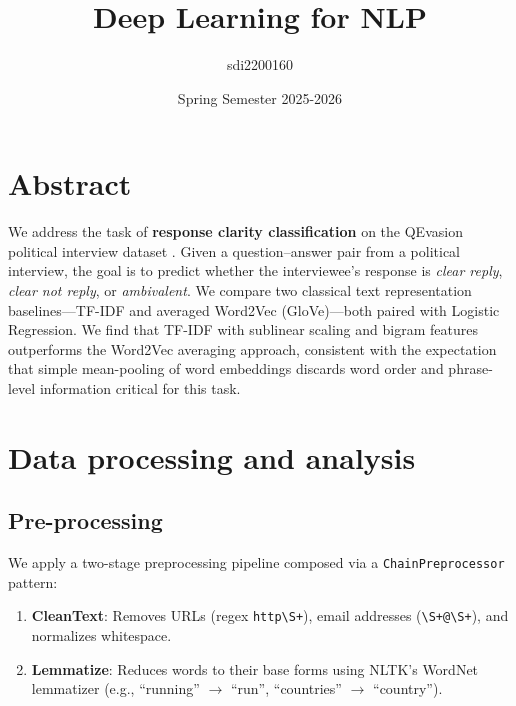 \documentclass[12pt]{fphw}
\title{Deep Learning for NLP} %
\author{sdi2200160} %
\date{Spring Semester 2025-2026} %
\institute{National and Kapodistrian University of Athens \\ Department of Informatics and Telecommunications} %
\begin{document}
\maketitle %

{
  \hypersetup{linkcolor=black}
  \tableofcontents
}
\newpage

\section{Abstract}

We address the task of \textbf{response clarity classification} on the QEvasion political interview dataset \cite{qevasion}. Given a question--answer pair from a political interview, the goal is to predict whether the interviewee's response is \emph{clear reply}, \emph{clear not reply}, or \emph{ambivalent}. We compare two classical text representation baselines---TF-IDF and averaged Word2Vec (GloVe)---both paired with Logistic Regression. We find that TF-IDF with sublinear scaling and bigram features outperforms the Word2Vec averaging approach, consistent with the expectation that simple mean-pooling of word embeddings discards word order and phrase-level information critical for this task.

\section{Data processing and analysis}

\subsection{Pre-processing}

We apply a two-stage preprocessing pipeline composed via a \texttt{ChainPreprocessor} pattern:

\begin{enumerate}
	\item \textbf{CleanText}: Removes URLs (regex \texttt{http\textbackslash S+}), email addresses (\texttt{\textbackslash S+@\textbackslash S+}), and normalizes whitespace.
	\item \textbf{Lemmatize}: Reduces words to their base forms using NLTK's WordNet lemmatizer \cite{nltk} (e.g., ``running'' $\to$ ``run'', ``countries'' $\to$ ``country'').
\end{enumerate}
\end{document}

